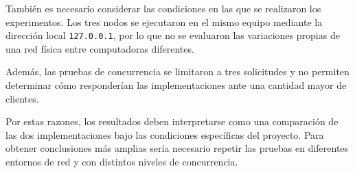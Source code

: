 También es necesario considerar las condiciones en las que se
realizaron los experimentos. Los tres nodos se ejecutaron en el mismo
equipo mediante la dirección local \texttt{127.0.0.1}, por lo que
no se evaluaron las variaciones propias de una red física entre
computadoras diferentes.

Además, las pruebas de concurrencia se limitaron a tres solicitudes
y no permiten determinar cómo responderían las implementaciones
ante una cantidad mayor de clientes.

Por estas razones, los resultados deben interpretarse como una
comparación de las dos implementaciones bajo las condiciones
específicas del proyecto. Para obtener conclusiones más amplias
sería necesario repetir las pruebas en diferentes entornos de red
y con distintos niveles de concurrencia.
